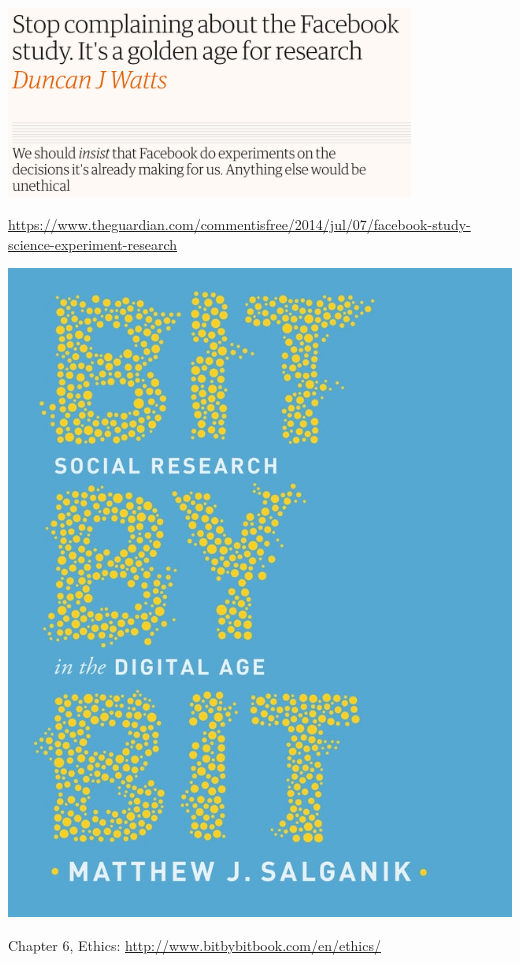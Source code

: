 \documentclass[aspectratio=169]{beamer}
\begin{document}
\begin{frame}

\begin{center}
\includegraphics[width=0.8\textwidth]{figures/watts_stop_2014_title}
\end{center}

{\tiny \url{https://www.theguardian.com/commentisfree/2014/jul/07/facebook-study-science-experiment-research}}\\ 


\end{frame}
\begin{frame}

\begin{center}
\includegraphics[height=0.7\textheight]{figures/salganik_bit_2018_cover}
\end{center}

Chapter 6, Ethics: \url{http://www.bitbybitbook.com/en/ethics/}

\end{frame}
\end{document}
